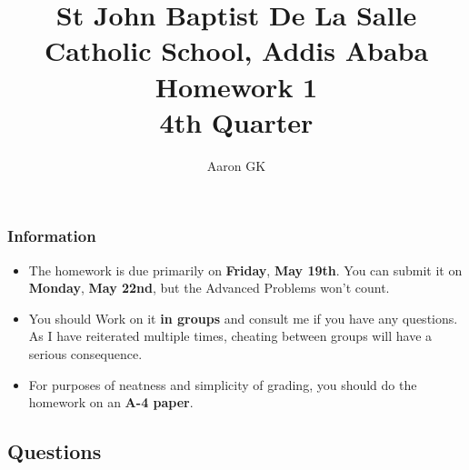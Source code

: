 \documentclass[11pt,addpoints]{exam}
\author{Aaron GK}
\begin{document}
	\title{St John Baptist De La Salle Catholic School, Addis Ababa\\
		\large Homework 1 \\
		4th Quarter}
	\maketitle
	\begin{center}
		\subsubsection*{Information}
		\begin{itemize}
			\item The homework is due primarily on \textbf{Friday}, \textbf{May 19th}. You can submit it on \textbf{Monday}, \textbf{May 22nd}, but the Advanced Problems won't count.
			\item You should Work on it \textbf{in groups} and consult me if you have any questions. As I have reiterated multiple times, cheating between groups will have a serious consequence.
			\item For purposes of neatness and simplicity of grading, you should do the homework on an \textbf{A-4 paper}.
		\end{itemize}
	\end{center}
	\begin{center}
		\subsection*{Questions}
	\end{center}
	
\end{document}

